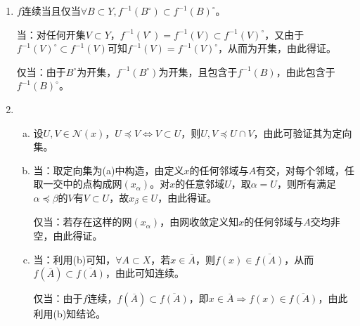 \documentclass[a4paper,UTF8,fontset=windows]{ctexart}
\begin{document}
\begin{enumerate}[(1)]
    \item
    $f$连续当且仅当$\forall B\subset Y,f^{-1}(B^\circ)\subset f^{-1}(B)^\circ$。
    
    当：对任何开集$V\subset Y$，$f^{-1}(V^\circ)=f^{-1}(V)\subset f^{-1}(V)^\circ$，又由于$f^{-1}(V)^\circ\subset f^{-1}(V)$可知$f^{-1}(V)=f^{-1}(V)^\circ$，从而为开集，由此得证。
    
    仅当：由于$B^\circ$为开集，$f^{-1}(B^\circ)$为开集，且包含于$f^{-1}(B)$，由此包含于$f^{-1}(B)^\circ$。
    
    \item
    \begin{enumerate}[(a)]
    \item
    设$U,V\in\mathcal{N}(x)$，$U\preceq V\Leftrightarrow V\subset U$，则$U,V\preceq U\cap V$，由此可验证其为定向集。
    
    \item
    当：取定向集为(a)中构造，由定义$x$的任何邻域与$A$有交，对每个邻域，任取一交中的点构成网$(x_\alpha)$。对$x$的任意邻域$U$，取$\alpha=U$，则所有满足$\alpha\preceq\beta$的$V$有$V\subset U$，故$x_\beta\in U$，由此得证。
    
    仅当：若存在这样的网$(x_\alpha)$，由网收敛定义知$x$的任何邻域与$A$交均非空，由此得证。
    
    \item
    当：利用(b)可知，$\forall A\subset X$，若$x\in\overline{A}$，则$f(x)\in\overline{f(A)}$，从而$f(\overline{A})\subset\overline{f(A)}$，由此可知连续。
    
    仅当：由于$f$连续，$f(\overline{A})\subset\overline{f(A)}$，即$x\in\overline{A}\Rightarrow f(x)\in\overline{f(A)}$，由此利用(b)知结论。
    \end{enumerate}
\end{enumerate}
\end{document}

